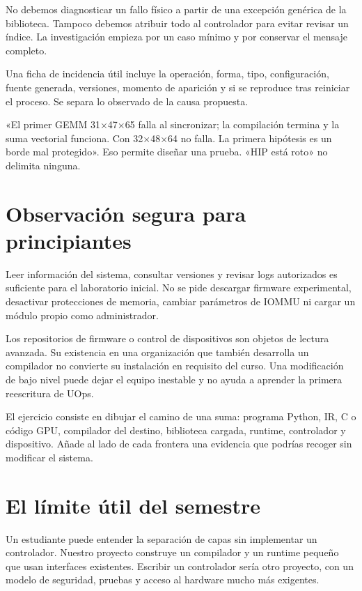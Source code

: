 \documentclass[12pt,a4paper,oneside]{report}
\begin{document}
No debemos diagnosticar un fallo físico a partir de una excepción genérica de la biblioteca. Tampoco debemos atribuir todo al controlador para evitar revisar un índice. La investigación empieza por un caso mínimo y por conservar el mensaje completo.

Una ficha de incidencia útil incluye la operación, forma, tipo, configuración, fuente generada, versiones, momento de aparición y si se reproduce tras reiniciar el proceso. Se separa lo observado de la causa propuesta.

\begin{ejemplo}
«El primer GEMM 31\ensuremath{\times}47\ensuremath{\times}65 falla al sincronizar; la compilación termina y la suma vectorial funciona. Con 32\ensuremath{\times}48\ensuremath{\times}64 no falla. La primera hipótesis es un borde mal protegido». Eso permite diseñar una prueba. «HIP está roto» no delimita ninguna.

\end{ejemplo}
\section{Observación segura para principiantes}
Leer información del sistema, consultar versiones y revisar logs autorizados es suficiente para el laboratorio inicial. No se pide descargar firmware experimental, desactivar protecciones de memoria, cambiar parámetros de IOMMU ni cargar un módulo propio como administrador.

Los repositorios de firmware o control de dispositivos son objetos de lectura avanzada. Su existencia en una organización que también desarrolla un compilador no convierte su instalación en requisito del curso. Una modificación de bajo nivel puede dejar el equipo inestable y no ayuda a aprender la primera reescritura de UOps.

El ejercicio consiste en dibujar el camino de una suma: programa Python, IR, C o código GPU, compilador del destino, biblioteca cargada, runtime, controlador y dispositivo. Añade al lado de cada frontera una evidencia que podrías recoger sin modificar el sistema.

\section{El límite útil del semestre}
Un estudiante puede entender la separación de capas sin implementar un controlador. Nuestro proyecto construye un compilador y un runtime pequeño que usan interfaces existentes. Escribir un controlador sería otro proyecto, con un modelo de seguridad, pruebas y acceso al hardware mucho más exigentes.
\end{document}

